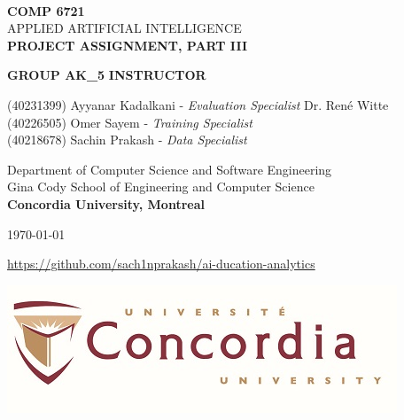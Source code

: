\begin{titlepage}
    \begin{center}
        \textbf{\Large\\ COMP 6721}
        \vspace{1cm}
        \Huge\\  APPLIED ARTIFICIAL INTELLIGENCE
        \vspace{1cm}
        \textbf{\Large\\PROJECT ASSIGNMENT, PART III}\\
        \vspace{2cm}
    
        \Large \textbf{GROUP AK\_5} \hfill  \textbf{INSTRUCTOR}\\
        \begin{large}
            \begin{flushleft}
                \vspace{.1cm}
                (40231399) Ayyanar Kadalkani - \textit{Evaluation Specialist} \hfill Dr. René Witte\\
                (40226505) Omer Sayem - \textit{Training Specialist}\\
                (40218678) Sachin Prakash - \textit{Data Specialist}\\
            \end{flushleft}
        \end{large}
    
        \begin{Large}  
            \vspace{1 cm}
            Department of Computer Science and Software Engineering \\
            Gina Cody School of Engineering and Computer Science \\
            \textbf{Concordia University, Montreal}\\
            \vspace{1 cm}
    
            \today \\
        \end{Large}
    \end{center}
    \vspace*{3em}
    \begin{center}
        \url{https://github.com/sach1nprakash/ai-ducation-analytics}
    \end{center}
  
    \vfill
    \begin{center}
      \includegraphics[width = 50ex]{resources/concordia_med.jpg}
    \end{center}    
\end{titlepage}